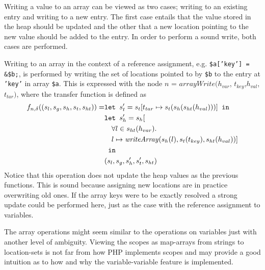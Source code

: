 Writing a value to an array can be viewed as two cases; writing to an existing entry and writing to a new entry. The first case entails that the value stored in the heap should be updated and the other that a new location pointing to the new value should be added to the entry. In order to perform a sound write, both cases are performed. 


Writing to an array in the context of a reference assignment, e.g. \texttt{\$a['key'] = \&\$b;}, is performed by writing the set of locations pointed to by \texttt{\$b} to the entry at \texttt{'key'} in array \texttt{\$a}.  This is expressed with the node $n$ = $\mathit{arrayWrite}(h_{var}$, $t_{key}$,$h_{val}$,$t_{tar})$, where the transfer function is defined as 
\begin{align}
    f_{n,\delta}((s_l, s_g, s_h, s_t, s_{ht})) = &\texttt{let } s_t' = s_t[t_{tar}\mapsto s_t(s_h(s_{ht}(h_{val})))] \texttt{ in }\notag\\
                              &\texttt{let } s_h' = s_h[\notag\\
                              &\quad \forall l \in s_{ht}(h_{var}).\notag\\
                              &\quad l\mapsto \mathit{writeArray}(s_h(l), s_t(t_{key}), s_{ht}(h_{val}))]\notag\\
                              & \texttt{ in }\notag\\
                              &(s_l, s_g, s_h', s_t', s_{ht})
\end{align}
Notice that this operation does not update the heap values as the previous functions. This is sound because assigning new locations are in practice overwriting old ones. If the array keys were to be exactly resolved a strong update could be performed here, just as the case with the reference assignment to variables.


The array operations might seem similar to the operations on variables just with another level of ambiguity. Viewing the scopes as map-arrays from strings to location-sets is not far from how PHP implements scopes and may provide a good intuition as to how and why the variable-variable feature is implemented. 

